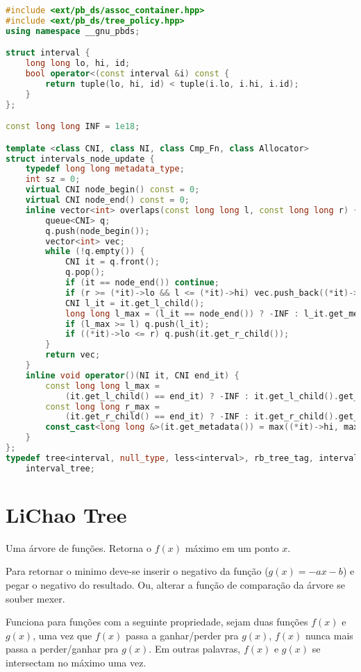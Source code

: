 \documentclass[10pt, a4paper, oneside]{book}
\begin{document}
\begin{lstlisting}[language=C++]
#include <ext/pb_ds/assoc_container.hpp>
#include <ext/pb_ds/tree_policy.hpp>
using namespace __gnu_pbds;

struct interval {
    long long lo, hi, id;
    bool operator<(const interval &i) const {
        return tuple(lo, hi, id) < tuple(i.lo, i.hi, i.id);
    }
};

const long long INF = 1e18;

template <class CNI, class NI, class Cmp_Fn, class Allocator>
struct intervals_node_update {
    typedef long long metadata_type;
    int sz = 0;
    virtual CNI node_begin() const = 0;
    virtual CNI node_end() const = 0;
    inline vector<int> overlaps(const long long l, const long long r) {
        queue<CNI> q;
        q.push(node_begin());
        vector<int> vec;
        while (!q.empty()) {
            CNI it = q.front();
            q.pop();
            if (it == node_end()) continue;
            if (r >= (*it)->lo && l <= (*it)->hi) vec.push_back((*it)->id);
            CNI l_it = it.get_l_child();
            long long l_max = (l_it == node_end()) ? -INF : l_it.get_metadata();
            if (l_max >= l) q.push(l_it);
            if ((*it)->lo <= r) q.push(it.get_r_child());
        }
        return vec;
    }
    inline void operator()(NI it, CNI end_it) {
        const long long l_max =
            (it.get_l_child() == end_it) ? -INF : it.get_l_child().get_metadata();
        const long long r_max =
            (it.get_r_child() == end_it) ? -INF : it.get_r_child().get_metadata();
        const_cast<long long &>(it.get_metadata()) = max((*it)->hi, max(l_max, r_max));
    }
};
typedef tree<interval, null_type, less<interval>, rb_tree_tag, intervals_node_update>
    interval_tree;
\end{lstlisting}
\hfill

\section{LiChao Tree}


Uma árvore de funções. Retorna o $f(x)$ máximo em um ponto $x$.



Para retornar o minimo deve-se inserir o negativo da função ($g(x) = -ax - b$) e pegar o negativo do resultado. Ou, alterar a função de comparação da árvore se souber mexer.



Funciona para funções com a seguinte propriedade, sejam duas funções $f(x)$ e $g(x)$, uma vez que $f(x)$ passa a ganhar/perder pra $g(x)$, $f(x)$ nunca mais passa a perder/ganhar pra $g(x)$. Em outras palavras, $f(x)$ e $g(x)$ se intersectam no máximo uma vez.
\end{document}
